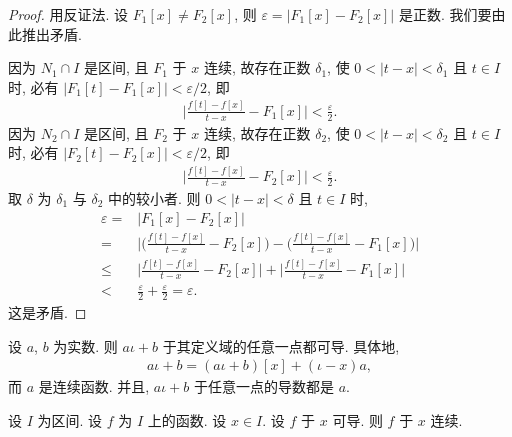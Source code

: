 \begin{proof}
    用反证法.
    设 $F_1 [x] \neq F_2 [x]$,
    则 $\varepsilon = |F_1 [x] - F_2 [x]|$ 是正数.
    我们要由此推出矛盾.

    因为 $N_1 \cap I$ 是区间, 且 $F_1$ 于 $x$ 连续,
    故存在正数 $\delta_1$,
    使 $0 < |t - x| < \delta_1$ 且 $t \in I$ 时,
    必有 $|F_1 [t] - F_1 [x]| < {\varepsilon}/{2}$,
    即
    \begin{align*}
        \Bigg| \frac{f[t] - f[x]}{t - x} - F_1 [x] \Bigg| < \frac{\varepsilon}{2}.
    \end{align*}
    因为 $N_2 \cap I$ 是区间,
    且 $F_2$ 于 $x$ 连续,
    故存在正数 $\delta_2$,
    使 $0 < |t - x| < \delta_2$ 且 $t \in I$ 时,
    必有 $|F_2 [t] - F_2 [x]| < {\varepsilon}/{2}$,
    即
    \begin{align*}
        \Bigg| \frac{f[t] - f[x]}{t - x} - F_2 [x] \Bigg| < \frac{\varepsilon}{2}.
    \end{align*}
    取 $\delta$ 为 $\delta_1$ 与 $\delta_2$ 中的较小者.
    则 $0 < |t - x| < \delta$ 且 $t \in I$ 时,
    \begin{align*}
        \varepsilon
        = {}    & |F_1 [x] - F_2 [x]|                                                                                                 \\
        = {}    & \Bigg| \Bigg( \frac{f[t] - f[x]}{t - x} - F_2 [x] \Bigg) - \Bigg( \frac{f[t] - f[x]}{t - x} - F_1 [x] \Bigg) \Bigg| \\
        \leq {} & \Bigg| \frac{f[t] - f[x]}{t - x} - F_2 [x] \Bigg| + \Bigg| \frac{f[t] - f[x]}{t - x} - F_1 [x] \Bigg|               \\
        < {}    & \frac{\varepsilon}{2} + \frac{\varepsilon}{2} = \varepsilon.
    \end{align*}
    这是矛盾.
\end{proof}

\begin{example}
    设 $a$, $b$ 为实数.
    则 $a\iota + b$ 于其定义域的任意一点都可导.
    具体地,
    \begin{align*}
        a\iota + b = (a\iota + b)[x] + (\iota - x)a,
    \end{align*}
    而 $a$ 是连续函数.
    并且, $a\iota + b$ 于任意一点的导数都是 $a$.
\end{example}

\begin{theorem}
    设 $I$ 为区间.
    设 $f$ 为 $I$ 上的函数.
    设 $x \in I$.
    设 $f$ 于 $x$ 可导.
    则 $f$ 于 $x$ 连续.
\end{theorem}

